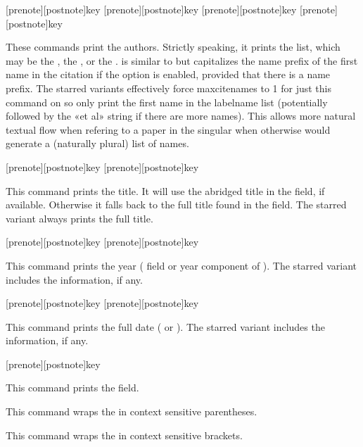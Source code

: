 \begin{ltxsyntax}

[prenote][postnote]{key}
[prenote][postnote]{key}
[prenote][postnote]{key}
[prenote][postnote]{key}

These commands print the authors. Strictly speaking, it prints the  list, which may be the
, the , or the .  is similar to  but capitalizes the name prefix of the first name in the citation if the  option is enabled, provided that there is a name prefix. The starred variants effectively force maxcitenames to 1 for just this command on so only print the first name in the labelname list (potentially followed by the «et al» string if there are more names). This allows more natural textual flow when refering to a paper in the singular when otherwise  would generate a (naturally plural) list of names.

[prenote][postnote]{key}
[prenote][postnote]{key}

This command prints the title. It will use the abridged title in the  field, if available. Otherwise it falls back to the full title found in the  field. The starred variant always prints the full title.

[prenote][postnote]{key}
[prenote][postnote]{key}

This command prints the year ( field or year component of ). The starred variant includes the  information, if any.

[prenote][postnote]{key}
[prenote][postnote]{key}

This command prints the full date ( or ). The starred variant includes the  information, if any.

[prenote][postnote]{key}

This command prints the  field.


This command wraps the  in context sensitive parentheses.


This command wraps the  in context sensitive brackets.

\end{ltxsyntax}

